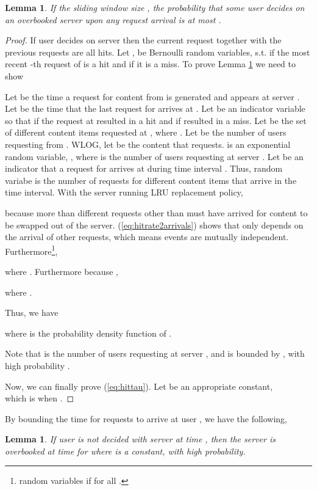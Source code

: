 \documentclass[conference]{IEEEtran}
\newtheorem{lemma}[theorem]{Lemma}
\begin{document}
\begin{lemma}\label{lem:overbookhit}
If the sliding window size , the probability that some user  decides on an overbooked server  upon any request arrival is at most  . 
\end{lemma}
\begin{proof}
If user  decides on server   then the current request together with the previous  requests are all hits. Let ,  be Bernoulli random variables, s.t.  if the most recent -th request of  is a hit and  if it is a miss. To prove Lemma \ref{lem:overbookhit} we need to show 

Let  be the time a request for content  from  is generated and appears at server . Let  be the time that the last request for  arrives at . Let  be an indicator variable so that  if the request at  resulted in a hit and  if resulted in a miss. Let  be the set of different content items requested at , where . Let  be the number of users requesting  from . WLOG, let  be the content that  requests.  is an exponential random variable, , where  is the number of users requesting  at server . Let  be an indicator that a request for  arrives at  during time interval .
Thus, random variabe  is the number of requests for different content items that arrive in the time interval. With the server running LRU replacement policy, 

because more than  different requests other than  must have arrived for content  to be swapped out of the server. (\ref{eq:hitrate2arrivals}) shows that  only depends on the arrival of other requests, which means events  are mutually independent. Furthermore\footnote{random variables  if  for all .},

where . Furthermore because , 

where .

Thus, we have 

where  is the probability density function of .

Note that  is the number of users requesting  at server , and is bounded by , with high probability \cite{raab1998balls}.

Now, we can finally prove (\ref{eq:hittau}). Let  be an appropriate constant,\\

which is  when .
\end{proof}

By bounding the time for  requests to arrive at user , we have the following,
\begin{lemma}\label{lem:timefortau}
If user  is not \textsl{decided} with server  at time , then the server is \textsl{overbooked} at time  for  where  is a constant, with high probability.
\end{lemma}
\end{document}
